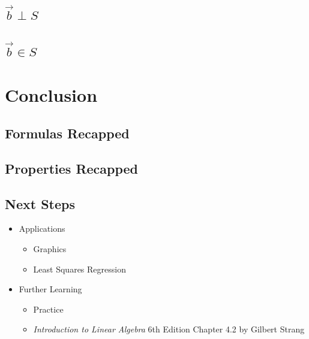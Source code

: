 \documentclass[12pt]{beamer}
\begin{document}
\subsection{$\vec{b} \perp S$}

\subsection{$\vec{b} \in S$}

\section{Conclusion}

\subsection{Formulas Recapped}

\subsection{Properties Recapped}

\subsection{Next Steps}

\begin{frame}
    \begin{itemize}
        \item Applications
              \begin{itemize}
                  \item Graphics
                  \item Least Squares Regression
              \end{itemize}
        \item Further Learning
              \begin{itemize}
                  \item Practice
                  \item \textit{Introduction to Linear Algebra} 6th Edition Chapter 4.2 by Gilbert Strang
              \end{itemize}
    \end{itemize}
\end{frame}
\end{document}
